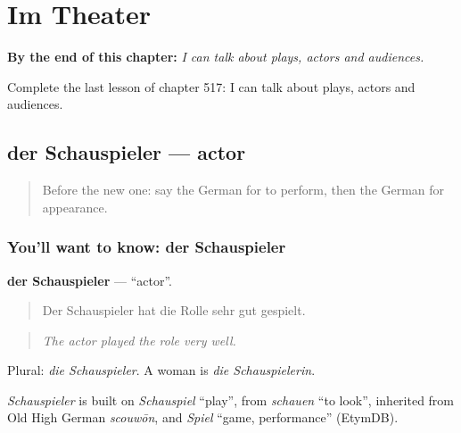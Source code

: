 
\chapter{Im Theater}
\label{ch:ge-im-theater}

\begin{chapteropening}
\textbf{By the end of this chapter:} \emph{I can talk about plays, actors and audiences.}

Complete the last lesson of chapter 517: I can talk about plays, actors and audiences.
\end{chapteropening}

\section[der Schauspieler]{der Schauspieler — actor}

\label{lesson:GE-C517-schauspieler}



\begin{quote}
Before the new one: say the German for to perform, then the German for appearance.
\end{quote}

\subsection*{You'll want to know: der Schauspieler}
\textbf{der Schauspieler} — \textquotedblleft{}actor\textquotedblright{}.

\begin{quote}
Der Schauspieler hat die Rolle sehr gut gespielt.
\end{quote}

\begin{quote}
\emph{The actor played the role very well.}
\end{quote}

Plural: \emph{die Schauspieler}. A woman is \emph{die Schauspielerin}.

\begin{cousinweb}
\emph{Schauspieler} is built on \emph{Schauspiel} \textquotedblleft{}play\textquotedblright{}, from \emph{schauen} \textquotedblleft{}to look\textquotedblright{}, inherited from Old High German \emph{scouwōn}, and \emph{Spiel} \textquotedblleft{}game, performance\textquotedblright{} (EtymDB).
\end{cousinweb}

